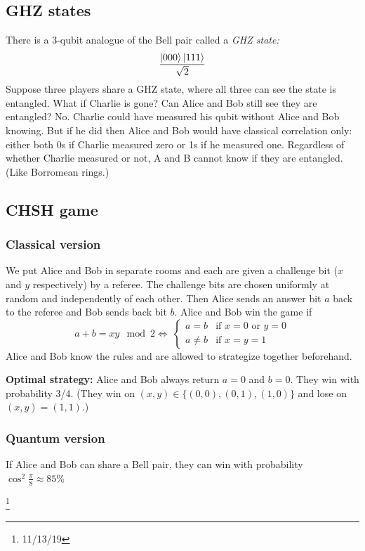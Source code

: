 \documentclass[12pt]{article}
\begin{document}
\subsection{GHZ states}
There is a 3-qubit analogue of the Bell pair called a \emph{GHZ state:}
\begin{equation}
    \frac{\ket{000} \ket{111}}{\sqrt{2}}
    \label{eq:GHZ-state}
\end{equation}
Suppose three players share a GHZ state, where all three can see the state is
entangled. What if Charlie is gone? Can Alice and Bob still see they are
entangled? No. Charlie could have measured his qubit without Alice and Bob
knowing. But if he did then Alice and Bob would have classical correlation
only: either both 0s if Charlie measured zero or 1s if he measured one.
Regardless of whether Charlie measured or not, A and B cannot know if they are
entangled. (Like Borromean rings.)

\subsection{CHSH game}
\subsubsection{Classical version}
We put Alice and Bob in separate rooms and each are given a challenge bit ($x$
and $y$ respectively) by a referee. The challenge bits are chosen uniformly at
random and independently of each other. Then Alice sends an answer bit $a$ back
to the referee and Bob sends back bit $b$. Alice and Bob win the game if
\[a + b = xy\mod{2} \Longleftrightarrow\
\begin{cases}
    a = b &\text{if $x=0$ or $y=0$}\\
    a \neq b &\text{if $x=y=1$}
\end{cases}\]
Alice and Bob know the rules and are allowed to strategize together beforehand.

\textbf{Optimal strategy:} Alice and Bob always return $a=0$ and $b=0$. They
win with probability 3/4. (They win on $(x,y) \in \{(0,0),(0,1),(1,0)\}$ and
lose on $(x,y)=(1,1)$.)

\subsubsection{Quantum version}
If Alice and Bob can share a Bell pair, they can win with probability
$\cos^2\frac{\pi}{8} \approx 85\%$

\footnote{11/13/19}
\end{document}
